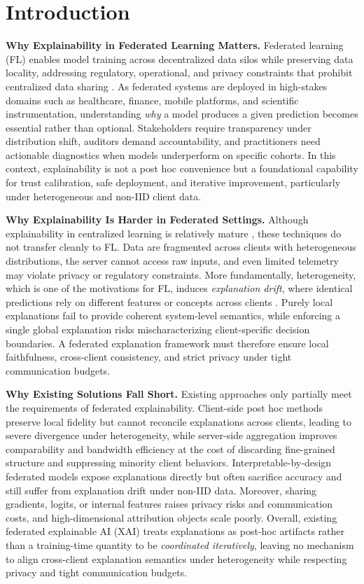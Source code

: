\documentclass{article}
\theoremstyle{plain}
\theoremstyle{definition}
\theoremstyle{remark}
\begin{document}
\section{Introduction}
\label{sec:intro}

\textbf{Why Explainability in Federated Learning Matters.}
Federated learning (FL) enables model training across decentralized data silos while preserving data locality, addressing regulatory, operational, and privacy constraints that prohibit centralized data sharing \citep{kairouz2021advances,li2020federated}. As federated systems are deployed in high-stakes domains such as healthcare, finance, mobile platforms, and scientific instrumentation, understanding \emph{why} a model produces a given prediction becomes essential rather than optional. Stakeholders require transparency under distribution shift, auditors demand accountability, and practitioners need actionable diagnostics when models underperform on specific cohorts. In this context, explainability is not a post hoc convenience but a foundational capability for trust calibration, safe deployment, and iterative improvement, particularly under heterogeneous and non-IID client data.

\textbf{Why Explainability Is Harder in Federated Settings.}
Although explainability in centralized learning is relatively mature \citep{arrieta2020explainable}, these techniques do not transfer cleanly to FL. Data are fragmented across clients with heterogeneous distributions, the server cannot access raw inputs, and even limited telemetry may violate privacy or regulatory constraints. More fundamentally, heterogeneity, which is one of the motivations for FL, induces \emph{explanation drift}, where identical predictions rely on different features or concepts across clients \citep{zhang2024survey}. Purely local explanations fail to provide coherent system-level semantics, while enforcing a single global explanation risks mischaracterizing client-specific decision boundaries. A federated explanation framework must therefore ensure local faithfulness, cross-client consistency, and strict privacy under tight communication budgets.

\textbf{Why Existing Solutions Fall Short.}
Existing approaches only partially meet the requirements of federated explainability. Client-side post hoc methods preserve local fidelity but cannot reconcile explanations across clients, leading to severe divergence under heterogeneity, while server-side aggregation improves comparability and bandwidth efficiency at the cost of discarding fine-grained structure and suppressing minority client behaviors. Interpretable-by-design federated models expose explanations directly but often sacrifice accuracy and still suffer from explanation drift under non-IID data. Moreover, sharing gradients, logits, or internal features raises privacy risks and communication costs, and high-dimensional attribution objects scale poorly. Overall, existing federated explainable AI (XAI) treats explanations as post-hoc artifacts rather than a training-time quantity to be \emph{coordinated iteratively}, leaving no mechanism to align cross-client explanation semantics under heterogeneity while respecting privacy and tight communication budgets.
\end{document}
